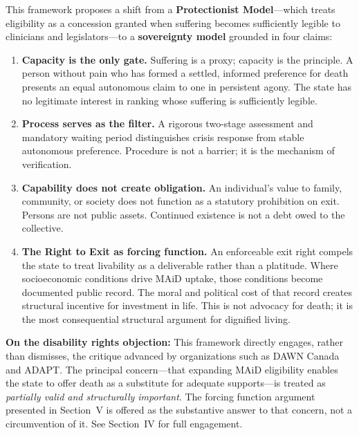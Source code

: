 \documentclass[11pt, letterpaper]{article}
\begin{document}
\medskip
This framework proposes a shift from a \textbf{Protectionist Model}---which treats eligibility
as a concession granted when suffering becomes sufficiently legible to clinicians and
legislators---to a \textbf{sovereignty model} grounded in four claims:

\begin{enumerate}
  \item \textbf{Capacity is the only gate.} Suffering is a proxy; capacity is the
    principle. A person without pain who has formed a settled, informed preference for
    death presents an equal autonomous claim to one in persistent agony. The state has
    no legitimate interest in ranking whose suffering is sufficiently legible.

  \item \textbf{Process serves as the filter.} A rigorous two-stage assessment and
    mandatory waiting period distinguishes crisis response from stable autonomous
    preference. Procedure is not a barrier; it is the mechanism of verification.

  \item \textbf{Capability does not create obligation.} An individual's value to
    family, community, or society does not function as a statutory prohibition on exit.
    Persons are not public assets. Continued existence is not a debt owed to the collective.

  \item \textbf{The Right to Exit as forcing function.} An enforceable exit right
    compels the state to treat livability as a deliverable rather than a platitude.
    Where socioeconomic conditions drive MAiD uptake, those conditions become documented
    public record. The moral and political cost of that record creates structural
    incentive for investment in life. This is not advocacy for death; it is the most
    consequential structural argument for dignified living.
\end{enumerate}

\begin{tcolorbox}[warningbox]
\textbf{On the disability rights objection:} This framework directly engages, rather than
dismisses, the critique advanced by organizations such as DAWN Canada and ADAPT. The
principal concern---that expanding MAiD eligibility enables the state to offer death as a
substitute for adequate supports---is treated as \emph{partially valid and structurally
important}. The forcing function argument presented in Section~V is offered as the
substantive answer to that concern, not a circumvention of it. See Section~IV for full
engagement.
\end{tcolorbox}
\end{document}
